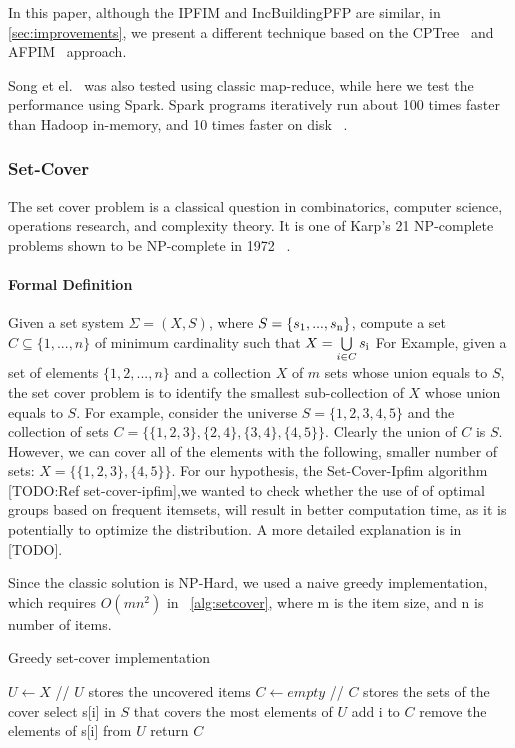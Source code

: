 In this paper, although the IPFIM and IncBuildingPFP are similar, in \autoref{sec:improvements}, we present a different technique based on the CPTree~\cite{tanbeer2009efficient} and AFPIM~\cite{koh2004efficient} approach.

Song et el.~\cite{song2017} was also tested using classic map-reduce, while here we test the performance using Spark. Spark programs iteratively run about 100 times faster than Hadoop in-memory, and 10 times faster on disk ~\cite{spark}.

\subsubsection{Set-Cover}
The set cover problem is a classical question in combinatorics, computer science, operations research, and complexity theory. It is one of Karp's 21 NP-complete problems shown to be NP-complete in 1972 ~\cite{setcoveralgo}.

\paragraph{Formal Definition} Given a set system $ \Sigma = (X, S)$, where $S = \{s \textsubscript{1}, . . . , s\textsubscript{n}\}$, compute a set $C \subseteq \{1, . . . , n\}$ of minimum cardinality such that $X = \bigcup\limits_{i \in C} s \textsubscript{i}\\ $ 
For Example, given a set of elements $ \displaystyle \{1,2,...,n\}$ and a collection $X$ of $\displaystyle m$ sets whose union equals to $S$, the set cover problem is to identify the smallest sub-collection of $\displaystyle X$ whose union equals to $S$. For example, consider the universe $\displaystyle S=\{1,2,3,4,5\}$ and the collection of sets $\displaystyle C=\{\{1,2,3\},\{2,4\},\{3,4\},\{4,5\}\}$. Clearly the union of $\displaystyle C$ is $\displaystyle S$. However, we can cover all of the elements with the following, smaller number of sets: $\displaystyle X= \{\{1,2,3\},\{4,5\}\}$.
For our hypothesis, the Set-Cover-Ipfim algorithm [TODO:Ref set-cover-ipfim],we wanted to check whether the use of of optimal groups based on frequent itemsets, will result in better computation time, as it is potentially to optimize the distribution. A more detailed explanation is in [TODO].

Since the classic solution is NP-Hard, we used a naive greedy implementation, which requires $ O(mn^2) $ in ~\ref{alg:setcover}, where m is the item size, and n is number of items.

\begin{algorithm}
  \caption{Greedy set-cover implementation}\label{setcover}
  \begin{algorithmic}[1]
   \label{alg:setcover}
      \State $U \gets X$  // $U$ stores the uncovered items
      \State $C \gets empty$ // $C$ stores the sets of the cover
        \State select s[i] in $S$ that covers the most elements of $U$
		\State add i to $C$
		\State remove the elements of s[i] from $U$
      \EndWhile
 	\State return $C$
    \EndProcedure
  \end{algorithmic}
\end{algorithm}
